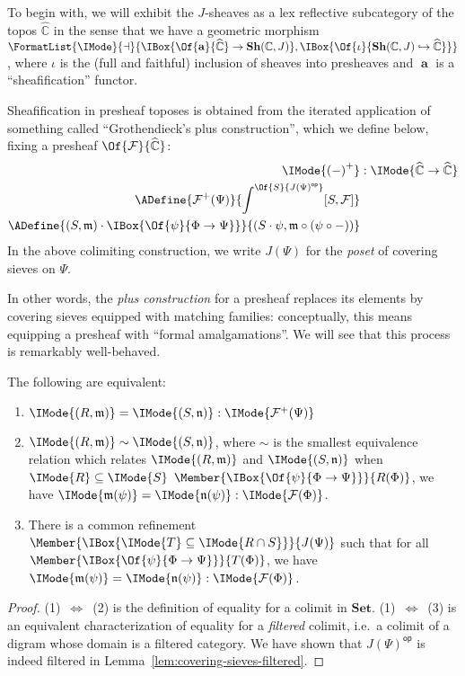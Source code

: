 \documentclass{article}
\newcommand\Sets{\mathbf{Set}}
\newcommand\OpCat[1]{{{#1}^{\mathsf{op}}}}
\newcommand\Psh[1]{\widehat{#1}}
\newcommand\Sh[1]{\mathbf{Sh} (#1)}
\newcommand\IsSubsetEq[2]{\IMode{#1}\subseteq\IMode{#2}}
\DeclareMathOperator{\Sheafify}{\mathbf{a}}
\newcommand\AreAdjoint[1]{\FormatList{\IMode}{\dashv}{#1}}
\newcommand\AOf[2]{\IMode{#1}&:\IMode{#2}}
\newcommand\Plus[1]{{#1}^+}
\newcommand\IsEqOf[3]{\IMode{#1}=\IMode{#2}:\IMode{#3}}
\newcommand\Sim[2]{\IMode{#1}\sim\IMode{#2}}
\begin{document}
To begin with, we will exhibit the $J$-sheaves as a lex reflective
subcategory of the topos $\Psh{\mathbb{C}}$ in the sense that we have
a geometric morphism
$\AreAdjoint{\IBox{\Of{\Sheafify}{\Psh{\mathbb{C}}}\to
    \Sh{\mathbb{C},J}},\IBox{\Of{\iota}{\Sh{\mathbb{C},J}\hookrightarrow\Psh{\mathbb{C}}}}}$,
where $\iota$ is the (full and faithful) inclusion of sheaves into
presheaves and $\Sheafify$ is a ``sheafification'' functor.

Sheafification in presheaf toposes is obtained from the iterated
application of something called ``Grothendieck's plus construction'',
which we define below, fixing a presheaf $\Of{\mathcal{F}}{\Psh{\mathbb{C}}}$:
\begin{align*}
  \AOf{
    \Plus{(-)}
  }{
    \Psh{\mathbb{C}}\to\Psh{\mathbb{C}}
  }
  \\
  \ADefine{
    \Plus{\mathcal{F}}(\Psi)
  }{
    \int^{\Of{S}{\OpCat{J(\Psi)}}}
    [S,\mathcal{F}]
  }
  \\
  \ADefine{
    (S,\mathfrak{m})\cdot\IBox{\Of{\psi}{\Phi\to\Psi}}
  }{
    (S\cdot\psi, \mathfrak{m}\circ (\psi\circ-))
  }
\end{align*}
In the above colimiting construction, we write $J(\Psi)$ for the
\emph{poset} of covering sieves on $\Psi$.

In other words, the \emph{plus construction} for a presheaf replaces
its elements by covering sieves equipped with matching families:
conceptually, this means equipping a presheaf with ``formal
amalgamations''. We will see that this process is remarkably
well-behaved.


\begin{lem}[Equality in $\Plus{\mathcal{F}}$]\label{lem:plus-construction-equality}
  The following are equivalent:
  \begin{enumerate}
  \item $\IsEqOf{(R,\mathfrak{m})}{(S,\mathfrak{n})}{\Plus{\mathcal{F}}(\Psi)}$
  \item $\Sim{(R,\mathfrak{m})}{(S,\mathfrak{n})}$, where
    $\sim$ is the smallest equivalence relation which relates
    $\IMode{(R,\mathfrak{m})}$ and $\IMode{(S,\mathfrak{n})}$ when $\IsSubsetEq{R}{S}$
    $\Member{\IBox{\Of{\psi}{\Phi\to\Psi}}}{R(\Phi)}$, we have
    $\IsEqOf{\mathfrak{m}(\psi)}{\mathfrak{n}(\psi)}{\mathcal{F}(\Phi)}$.
  \item There is a common refinement
    $\Member{\IBox{\IsSubsetEq{T}{R\cap S}}}{J(\Psi)}$ such that for
    all $\Member{\IBox{\Of{\psi}{\Phi\to\Psi}}}{T(\Phi)}$, we have
    $\IsEqOf{\mathfrak{m}(\psi)}{\mathfrak{n}(\psi)}{\mathcal{F}(\Phi)}$.
  \end{enumerate}
\end{lem}
\begin{proof}
  (1)~$\Leftrightarrow$~(2) is the definition of equality for a colimit in
  $\Sets$.
  (1)~$\Leftrightarrow$~(3) is an equivalent characterization of
  equality for a \emph{filtered} colimit, i.e.\ a colimit of a digram
  whose domain is a filtered category. We have shown that
  $\OpCat{J(\Psi)}$ is indeed filtered in
  Lemma~\ref{lem:covering-sieves-filtered}.
\end{proof}
\end{document}
